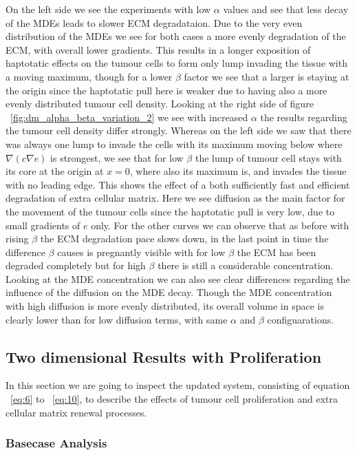 On the left side we see the experiments with low $\alpha$ values and see that less decay of the MDEs leads to slower ECM degradataion. Due to the very even distribution of the MDEs we see for both cases a more evenly degradation of the ECM, with overall lower gradients. This results in a longer exposition of haptotatic effects on the tumour cells to form only lump invading the tissue with a moving maximum, though for a lower $\beta$ factor we see that a larger is staying at the origin since the haptotatic pull here is weaker due to having also a more evenly distributed tumour cell density.\newline 
Looking at the right side of figure ~\ref{fig:dm_alpha_beta_variation_2} we see with increased $\alpha$ the results regarding the tumour cell density differ strongly. Whereas on the left side we saw that there was always one lump to invade the cells with its maximum moving below where $\nabla(c\nabla e)$ is strongest, we see that for low $\beta$ the lump of tumour cell stays with its core at the origin at $x=0$, where also its maximum is, and invades the tissue with no leading edge. This shows the effect of a both sufficiently fast and efficient degradation of extra cellular matrix. Here we see diffusion as the main factor for the movement of the tumour cells since the haptotatic pull is very low, due to small gradients of $e$ only. For the other curves we can observe that as before with rising $\beta$ the ECM degradation pace slows down, in the last point in time the difference $\beta$ causes is pregnantly visible with for low $\beta$ the ECM has been degraded completely but for high $\beta$ there is still a considerable concentration. Looking at the MDE concentration we can also see clear differences regarding the influence of the diffusion on the MDE decay. Though the MDE concentration with high diffusion is more evenly distributed, its overall volume in space is clearly lower than for low diffusion terms, with same $\alpha$ and $\beta$ configuarations.



\subsection{Two dimensional Results with Proliferation}
In this section we are going to inspect the updated system, consisting of equation ~\ref{eq:6} to ~\ref{eq:10}, to describe the effects of tumour cell proliferation and extra cellular matrix renewal processes.

\subsubsection*{Basecase Analysis}

